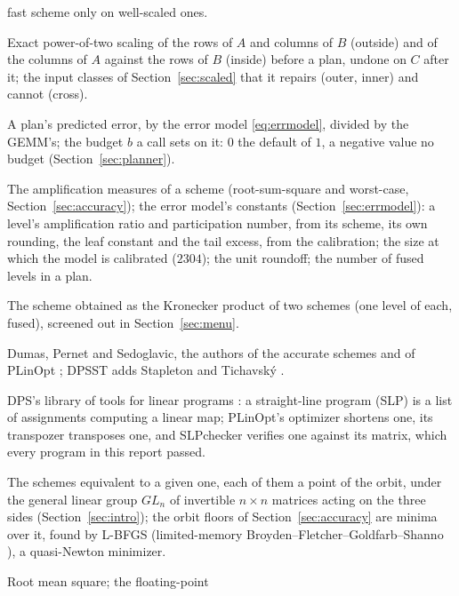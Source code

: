 \documentclass[11pt]{article}
\newcommand{\ginf}{\gamma_{\infty,2}}
\newcommand{\amp}{\operatorname{amp}}
\newcommand{\lv}[1]{\texttt{#1}}
\begin{document}
\begin{description}
  fast scheme only on well-scaled ones.
\item[Prescaling; outer, inner, cross.]  Exact power-of-two scaling of the
  rows of $A$ and columns of $B$ (outside) and of the columns of $A$ against
  the rows of $B$ (inside) before a plan, undone on $C$ after it; the input
  classes of Section~\ref{sec:scaled} that it repairs (outer, inner) and
  cannot (cross).
\item[Error growth, \lv{max\_growth}, \lv{auto:}$b$.]  A plan's predicted
  error, by the error model \eqref{eq:errmodel}, divided by the GEMM's; the budget $b$ a call
  sets on it: $0$ the default of $1$, a negative value no budget
  (Section~\ref{sec:planner}).
\item[$\amp$, $\ginf$, $a_X$, $\nu_X$, $\pi_X$, $c$, $\beta$, $N_E$, $u$, $d$.]  The amplification
  measures of a scheme (root-sum-square and worst-case,
  Section~\ref{sec:accuracy}); the error model's constants
  (Section~\ref{sec:errmodel}): a level's amplification ratio and
  participation number, from its scheme, its own rounding, the leaf constant
  and the tail excess, from the calibration; the size at which the model is
  calibrated ($2304$); the unit roundoff; the number of
  fused levels in a plan.
\item[Kronecker composite.]  The scheme obtained as the Kronecker product of
  two schemes (one level of each, fused), screened out in
  Section~\ref{sec:menu}.
\item[DPS.]  Dumas, Pernet and Sedoglavic, the authors of the accurate
  schemes and of PLinOpt \cite{DPS24,DPS25,DPS26a,DPS26b}; DPSST adds
  Stapleton and Tichavsk\'y \cite{DPSST26}.
\item[PLinOpt, SLP, SLPchecker.]  DPS's library of tools for linear
  programs \cite{PLinOpt}: a straight-line program (SLP) is a list of
  assignments computing a linear map; PLinOpt's optimizer shortens one, its
  transpozer transposes one, and SLPchecker verifies one against its matrix,
  which every program in this report passed.
\item[Orbit (class), point, $GL_n$.]  The schemes equivalent to a given one, each of them a point of the orbit, under the
  general linear group $GL_n$ of invertible $n\times n$ matrices acting on
  the three sides \cite{deGroote78} (Section~\ref{sec:intro}); the orbit floors of Section~\ref{sec:accuracy} are minima
  over it, found by L-BFGS (limited-memory Broyden--Fletcher--Goldfarb--Shanno \cite{LN89}), a quasi-Newton minimizer.
\item[RMS, IEEE 754, SIMD.]  Root mean square; the floating-point

\end{description}
\end{document}
